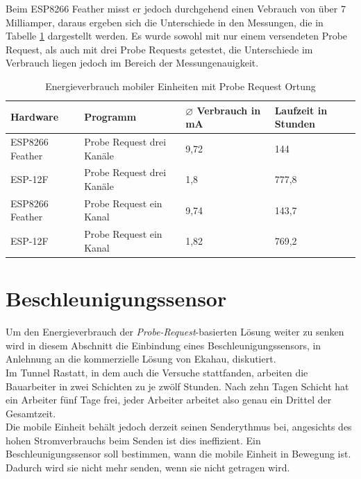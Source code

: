 Beim ESP8266 Feather misst er jedoch durchgehend einen Vebrauch von über 7 Milliamper, daraus ergeben sich die Unterschiede in den Messungen, die in Tabelle \ref{table:probereqina} dargestellt werden.
Es wurde sowohl mit nur einem versendeten Probe Request, als auch mit drei Probe Requests getestet, die Unterschiede im Verbrauch liegen jedoch im Bereich der Messungenauigkeit.

\begin{table}[h!]
	\centering
	\caption{Energieverbrauch mobiler Einheiten mit Probe Request Ortung}
	\label{table:probereqina}
	\begin{tabular}{p{3.5cm}|p{5cm}|p{2.5cm}|p{2.5cm}}
		Hardware & Programm & $\varnothing$ Verbrauch in mA & Laufzeit in Stunden\\
		\hline
		ESP8266 Feather & Probe Request drei Kanäle & 9,72 & 144\\
		ESP-12F & Probe Request drei Kanäle & 1,8 & 777,8\\
		ESP8266 Feather & Probe Request ein Kanal & 9,74 & 143,7\\
		ESP-12F & Probe Request ein Kanal & 1,82 & 769,2\\
	\end{tabular}
\end{table}

\section{Beschleunigungssensor}
\label{ch:Beschleunigungssensor}
Um den Energieverbrauch der \emph{Probe-Request}-basierten Lösung weiter zu senken wird in diesem Abschnitt die Einbindung eines Beschleunigungssensors, in Anlehnung an die kommerzielle Lösung von Ekahau, diskutiert. \\
Im Tunnel Rastatt, in dem auch die Versuche stattfanden, arbeiten die Bauarbeiter in zwei Schichten zu je zwölf Stunden. 
Nach zehn Tagen Schicht hat ein Arbeiter fünf Tage frei, jeder Arbeiter arbeitet also genau ein Drittel der Gesamtzeit. \\
Die mobile Einheit behält jedoch derzeit seinen Senderythmus bei, angesichts des hohen Stromverbrauchs beim Senden ist dies ineffizient.
Ein Beschleunigungssensor soll bestimmen, wann die mobile Einheit in Bewegung ist. 
Dadurch wird sie nicht mehr senden, wenn sie nicht getragen wird.

